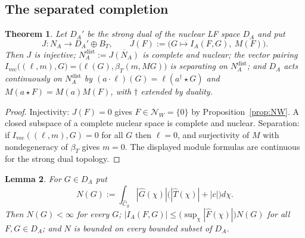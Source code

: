 \documentclass[11pt]{amsart}
\newtheorem{theorem}{Theorem}[section]
\newtheorem{lemma}[theorem]{Lemma}
\theoremstyle{definition}
\theoremstyle{remark}
\newcommand{\Th}{\widehat{T}}
\newcommand{\Ch}{\widehat{C}_S}
\newcommand{\DA}{D_A}
\newcommand{\Nrad}{\mathcal N}
\newcommand{\BT}{B_T}
\newcommand{\NAd}{N_A^{\mathrm{dist}}}
\begin{document}
\subsection{The separated completion}

\begin{theorem}\label{thm:completion}
Let $\DA'$ be the strong dual of the nuclear LF space $\DA$ and put
\begin{equation}\label{eq:J}
J:N_A\longrightarrow\DA'\oplus\BT,\qquad
J(F):=\bigl(G\mapsto I_A(F,G),\ M(F)\bigr).
\end{equation}
Then $J$ is injective; $\NAd:=\overline{J(N_A)}$ is complete and nuclear; the
vector pairing $I_{\mathrm{vec}}\bigl((\ell,m),G\bigr)=
\bigl(\ell(G),\beta_T(m,MG)\bigr)$ is separating on $\NAd$; and $\DA$ acts
continuously on $\NAd$ by $(a\cdot\ell)(G)=\ell(a^{\dagger}\star G)$ and
$M(a\star F)=M(a)M(F)$, with $\dagger$ extended by duality.
\end{theorem}

\begin{proof}
Injectivity: $J(F)=0$ gives $F\in\Nrad_W=\{0\}$ by
Proposition~\ref{prop:NW}.  A closed subspace of a complete nuclear space is
complete and nuclear.  Separation: if $I_{\mathrm{vec}}((\ell,m),G)=0$ for all
$G$ then $\ell=0$, and surjectivity of $M$ with nondegeneracy of $\beta_T$
gives $m=0$.  The displayed module formulas are continuous for the strong dual
topology.
\end{proof}

\begin{lemma}\label{lem:Nseminorm}
For $G\in\DA$ put
\begin{equation}\label{eq:Nsemi}
N(G):=\int_{\Ch}|\widehat G(\chi)|\bigl(|\Th(\chi)|+|c|\bigr)d\chi .
\end{equation}
Then $N(G)<\infty$ for every $G$; $|I_A(F,G)|\le
\bigl(\sup_{\chi}|\widehat F(\chi)|\bigr)N(G)$ for all $F,G\in\DA$; and $N$ is
bounded on every bounded subset of $\DA$.
\end{lemma}
\end{document}
